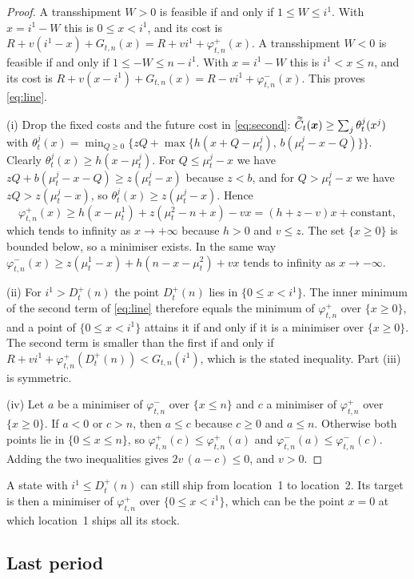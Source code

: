 \documentclass[11pt]{article}
\DeclareRobustCommand{\dbtilde}[1]{\accentset{\approx}{#1}}
\renewcommand{\vec}[1]{\boldsymbol{#1}}
\newcommand{\Cq}{\dbtilde{C}}
\theoremstyle{definition}
\begin{document}
\begin{proof}
A transshipment $W>0$ is feasible if and only if $1\le W\le i^1$. With $x=i^1-W$ this is $0\le x<i^1$, and its cost is $R+v(i^1-x)+G_{t,n}(x)=R+vi^1+\varphi^+_{t,n}(x)$. A transshipment $W<0$ is feasible if and only if $1\le -W\le n-i^1$. With $x=i^1-W$ this is $i^1<x\le n$, and its cost is $R+v(x-i^1)+G_{t,n}(x)=R-vi^1+\varphi^-_{t,n}(x)$. This proves \eqref{eq:line}.

(i) Drop the fixed costs and the future cost in \eqref{eq:second}: $\Cq_t(\vec{x})\ge\sum_j\theta^j_t(x^j)$ with $\theta^j_t(x)=\min_{Q\ge0}\{zQ+\max\{h(x+Q-\mu^j_t),\,b(\mu^j_t-x-Q)\}\}$. Clearly $\theta^j_t(x)\ge h(x-\mu^j_t)$. For $Q\le\mu^j_t-x$ we have $zQ+b(\mu^j_t-x-Q)\ge z(\mu^j_t-x)$ because $z<b$, and for $Q>\mu^j_t-x$ we have $zQ>z(\mu^j_t-x)$, so $\theta^j_t(x)\ge z(\mu^j_t-x)$. Hence
\[
\varphi^+_{t,n}(x)\ge h(x-\mu^1_t)+z(\mu^2_t-n+x)-vx=(h+z-v)x+\text{constant},
\]
which tends to infinity as $x\to+\infty$ because $h>0$ and $v\le z$. The set $\{x\ge0\}$ is bounded below, so a minimiser exists. In the same way $\varphi^-_{t,n}(x)\ge z(\mu^1_t-x)+h(n-x-\mu^2_t)+vx$ tends to infinity as $x\to-\infty$.

(ii) For $i^1>D^+_t(n)$ the point $D^+_t(n)$ lies in $\{0\le x<i^1\}$. The inner minimum of the second term of \eqref{eq:line} therefore equals the minimum of $\varphi^+_{t,n}$ over $\{x\ge0\}$, and a point of $\{0\le x<i^1\}$ attains it if and only if it is a minimiser over $\{x\ge0\}$. The second term is smaller than the first if and only if $R+vi^1+\varphi^+_{t,n}(D^+_t(n))<G_{t,n}(i^1)$, which is the stated inequality. Part (iii) is symmetric.

(iv) Let $a$ be a minimiser of $\varphi^-_{t,n}$ over $\{x\le n\}$ and $c$ a minimiser of $\varphi^+_{t,n}$ over $\{x\ge0\}$. If $a<0$ or $c>n$, then $a\le c$ because $c\ge0$ and $a\le n$. Otherwise both points lie in $\{0\le x\le n\}$, so $\varphi^+_{t,n}(c)\le\varphi^+_{t,n}(a)$ and $\varphi^-_{t,n}(a)\le\varphi^-_{t,n}(c)$. Adding the two inequalities gives $2v\,(a-c)\le0$, and $v>0$.
\end{proof}

A state with $i^1\le D^+_t(n)$ can still ship from location~1 to location~2. Its target is then a minimiser of $\varphi^+_{t,n}$ over $\{0\le x<i^1\}$, which can be the point $x=0$ at which location~1 ships all its stock.

\subsection{Last period}
\end{document}
